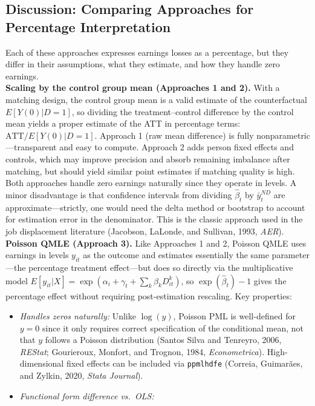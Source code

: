 \documentclass{article}
\begin{document}
\begin{itemize}
\subsection*{Discussion: Comparing Approaches for Percentage Interpretation}
Each of these approaches expresses earnings losses as a percentage, but they differ in their
assumptions, what they estimate, and how they handle zero earnings.
\\
\textbf{Scaling by the control group mean (Approaches 1 and 2).}
With a matching design, the control group mean is a valid estimate of the counterfactual
$ E[Y(0)|D=1]$, so dividing the treatment--control difference by the control mean yields a proper
estimate of the ATT in percentage terms: $\text{ATT} / E[Y(0)|D=1]$.
Approach 1 (raw mean difference) is fully nonparametric---transparent and easy to compute.
Approach 2 adds person fixed effects and controls, which may improve precision and absorb
remaining imbalance after matching, but should yield similar point estimates if matching quality
is high. Both approaches handle zero earnings naturally since they operate in levels.
A minor disadvantage is that confidence intervals from dividing $\hat{\beta}_t$ by $\bar{y}_t^{ND}$
are approximate---strictly, one would need the delta method or bootstrap to account for
estimation error in the denominator.
This is the classic approach used in the job displacement literature
(Jacobson, LaLonde, and Sullivan, 1993, \textit{AER}).
\\
\textbf{Poisson QMLE (Approach 3).}
Like Approaches 1 and 2, Poisson QMLE uses earnings in levels $ y_{it}$ as the outcome
and estimates essentially the same parameter---the percentage treatment effect---but
does so directly via the multiplicative model
$ E[y_{it}|X] = \exp(\alpha_i + \gamma_t + \sum_k \beta_k D_{it}^k)$,
so $\exp(\hat{\beta}_t) - 1$ gives the percentage effect without requiring post-estimation rescaling.
Key properties:
\begin{itemize}
\item \textit{Handles zeros naturally:} Unlike $\log(y)$, Poisson PML is well-defined for $ y=0$
since it only requires correct specification of the conditional mean, not that $ y$ follows
a Poisson distribution (Santos Silva and Tenreyro, 2006, \textit{REStat};
Gourieroux, Monfort, and Trognon, 1984, \textit{Econometrica}).
High-dimensional fixed effects can be included via \texttt{ppmlhdfe}
(Correia, Guimar\~{a}es, and Zylkin, 2020, \textit{Stata Journal}).
\item \textit{Functional form difference vs.\ OLS:}

\end{itemize}
\end{itemize}
\end{document}
